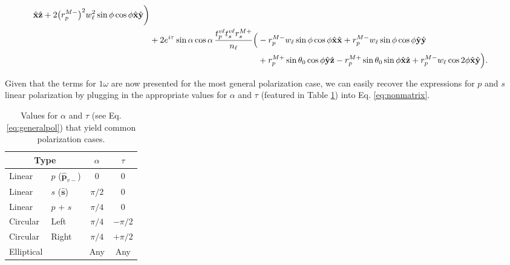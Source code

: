 \documentclass[aps,pra,10pt,amsmath,twocolumn,letterpaper]{revtex4-1}
\begin{document}
\begin{widetext}
\begin{equation}
\begin{split}
    \hat{\mathbf{x}}\hat{\mathbf{z}}
  + 2\big(r^{M-}_{p}\big)^{2}w^{2}_{\ell}\sin\phi\cos\phi
    \hat{\mathbf{x}}\hat{\mathbf{y}}
\bigg)\\
&+
2e^{i\tau}\sin\alpha\cos\alpha\,
\frac{t^{v\ell}_{p}t^{v\ell}_{s}r^{M+}_{s}}{n_{\ell}}
\Big(
  - r^{M-}_{p}w_{\ell}\sin\phi\cos\phi
    \hat{\mathbf{x}}\hat{\mathbf{x}}
  + r^{M-}_{p}w_{\ell}\sin\phi\cos\phi
    \hat{\mathbf{y}}\hat{\mathbf{y}}\\
  &\hspace{4.5cm}+ r^{M+}_{p}\sin\theta_{0}\cos\phi
    \hat{\mathbf{y}}\hat{\mathbf{z}}
  - r^{M+}_{p}\sin\theta_{0}\sin\phi
    \hat{\mathbf{x}}\hat{\mathbf{z}}
  + r^{M-}_{p}w_{\ell}\cos 2\phi
    \hat{\mathbf{x}}\hat{\mathbf{y}}
\Big).
\end{split}
\end{equation}
\end{widetext}

Given that the terms for $1\omega$ are now presented for the most general
polarization case, we can easily recover the expressions for $p$ and $s$ linear
polarization by plugging in the appropriate values for $\alpha$ and $\tau$
(featured in Table \ref{tab:polcases}) into Eq. \eqref{eq:nonmatrix}.

\begin{table}[t]
\caption{Values for $\alpha$ and $\tau$ (see Eq. \eqref{eq:generalpol}) that
yield common polarization cases.\label{tab:polcases}}
\begin{tabular}{ | l l | c c | }
\hline
\multicolumn{2}{|c|}{Type}                    & $\alpha$  & $\tau$    \\
\hline
Linear        & $p$ ($\hat{\mathbf{p}}_{v-}$) & 0         & 0         \\
Linear        & $s$ ($\hat{\mathbf{s}}$)      & $\pi/2$   & 0         \\
Linear        & $p$ + $s$ & $\pi/4$           & 0         \\
\hline
Circular      & Left                          & $\pi/4$   & $-\pi/2$  \\
Circular      & Right                         & $\pi/4$   & $+\pi/2$  \\
\hline
Elliptical    &                               & Any       & Any       \\
\hline
\end{tabular}
\end{table}


\end{document}
